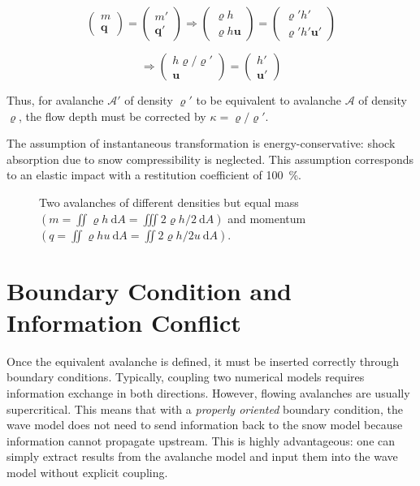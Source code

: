 \documentclass[11pt]{article}
\begin{document}
$$\begin{pmatrix}m\\\bm q\end{pmatrix} =\begin{pmatrix}m'\\\bm q'\end{pmatrix}
\Rightarrow\begin{pmatrix}\varrho h\\\varrho h \bm u\end{pmatrix} = \begin{pmatrix}\varrho' h'\\\varrho' h' \bm u'\end{pmatrix}$$

\begin{equation}\label{eq:equiv}
    \Rightarrow \begin{pmatrix}h\varrho/\varrho' \\\bm u\end{pmatrix} = \begin{pmatrix}h'\\\bm u'\end{pmatrix}
\end{equation}

Thus, for avalanche $\mathcal A'$ of density $\varrho'$ to be equivalent to avalanche $\mathcal A$ of density $\varrho$, the flow depth must be corrected by $\kappa=\varrho/\varrho'$.

The assumption of instantaneous transformation is energy-conservative: shock absorption due to snow compressibility is neglected.
This assumption corresponds to an elastic impact with a restitution coefficient of \SI{100}{\percent}.

\begin{figure}
    \centering
    
    \caption{Two avalanches of different densities but equal mass $\left(m=\iint\varrho h~\mathrm dA=\iiint2\varrho h/2~\mathrm dA\right)$ and momentum $\left(q=\iint\varrho hu~\mathrm dA=\iint2\varrho h/2 u~\mathrm dA\right)$.}
    \label{fig:avalanches_equivalentes}
\end{figure}

\section{Boundary Condition and Information Conflict}

Once the equivalent avalanche is defined, it must be inserted correctly through boundary conditions.
Typically, coupling two numerical models requires information exchange in both directions.
However, flowing avalanches are usually supercritical.
This means that with a \emph{properly oriented} boundary condition, the wave model does not need to send information back to the snow model because information cannot propagate upstream.
This is highly advantageous: one can simply extract results from the avalanche model and input them into the wave model without explicit coupling.
\end{document}
